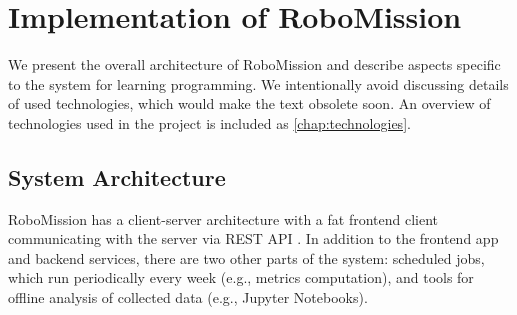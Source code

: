 \chapter{Implementation of RoboMission}
\label{chap:implementation-of-robomission}



We present the overall architecture of RoboMission
and describe aspects specific to the system for learning programming.
We intentionally avoid discussing details of used technologies,
which would make the text obsolete soon.
An overview of technologies used in the project is included as \cref{chap:technologies}.

\section{System Architecture}

RoboMission has a client-server architecture
with a fat frontend client communicating with the server via REST API
\cite{rest-api}.
In addition to the frontend app and backend services,
there are two other parts of the system:
scheduled jobs, which run periodically every week (e.g., metrics computation),
and tools for offline analysis of collected data
(e.g., Jupyter Notebooks). %

